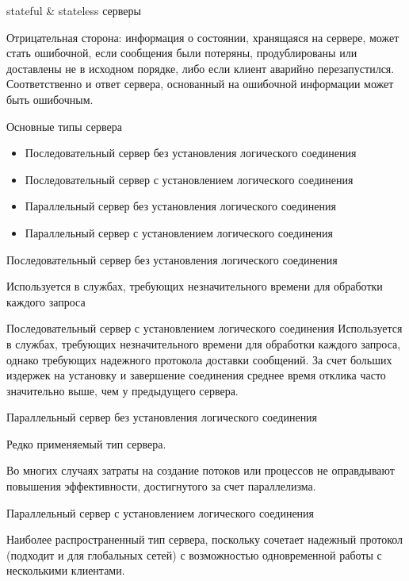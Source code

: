 \begin{frame}{stateful \& stateless серверы}

	Отрицательная сторона: информация о состоянии,  хранящаяся на сервере,  может стать ошибочной,
	если сообщения были потеряны,  продублированы или доставлены не в исходном порядке,  
	либо если клиент аварийно перезапустился. 
	Соответственно и ответ сервера,  основанный на ошибочной информации может быть ошибочным.
\end{frame}

\begin{frame}{Основные типы сервера}
	\begin{itemize}
		\item Последовательный сервер без установления логического соединения
		\item Последовательный сервер с установлением логического соединения
		\item Параллельный сервер без установления логического соединения
		\item Параллельный сервер с установлением логического соединения
	\end{itemize}
\end{frame}

\begin{frame}{Последовательный сервер без установления логического соединения}

	Используется в службах,  требующих незначительного времени для обработки каждого запроса
\end{frame}

\begin{frame}{Последовательный сервер с установлением логического соединения}
Используется в службах,  требующих незначительного времени для обработки каждого запроса,  
однако требующих надежного протокола доставки сообщений. 
За счет больших издержек на установку и завершение соединения среднее время отклика часто значительно выше,  чем у предыдущего сервера.
\end{frame}

\begin{frame}{Параллельный сервер без установления логического соединения}

	Редко применяемый тип сервера. 
	
	Во многих случаях затраты на создание потоков или процессов не оправдывают повышения эффективности,  достигнутого за счет параллелизма.
\end{frame}

\begin{frame}{Параллельный сервер с установлением логического соединения}

	Наиболее распространенный тип сервера,  поскольку сочетает надежный протокол (подходит и для глобальных сетей) с возможностью одновременной работы с несколькими клиентами.
\end{frame}

